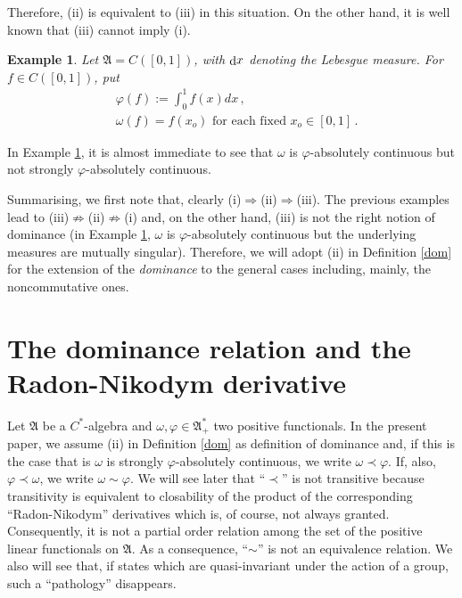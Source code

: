 \documentclass[12pt]{amsart}
\numberwithin{equation}{section}
\def\ga{{\mathfrak A}} \def\gpa{{\mathfrak a}}
\def\f{\varphi}\def\ff{\phi} \def\F{\Phi}
\def\om{\omega} \def\Om{\Omega}
\newtheorem{exa}[thm]{Example}
\def\di{\mathop{\rm d}\!}
\begin{document}
Therefore, (ii) is equivalent to (iii) in this situation. On the other hand, it is well known that (iii) cannot imply (i).
\begin{exa}
\label{exa2}
Let $\ga=C([0,1])$, with $\di x$ denoting the Lebesgue measure. For $f\in C([0,1])$, put
\begin{equation*}
\begin{split}
&\f(f):=\int_0^1 f(x)dx\,,\\
&\om(f)=f(x_o)\,\,\text{for each fixed}\,\, x_o\in[0,1]\,.
\end{split}
\end{equation*}
\end{exa}
In Example \ref{exa2}, it is almost immediate to see that $\om$ is $\f$-absolutely continuous but not strongly $\f$-absolutely continuous.

Summarising, we first note that, clearly (i)$\Rightarrow$(ii)$\Rightarrow$(iii). The previous examples lead to (iii)$\nRightarrow$(ii)$\nRightarrow$(i) and, on the other hand, (iii) is not the right notion of dominance (in Example \ref{exa2}, $\om$ is $\f$-absolutely continuous but the underlying measures are mutually singular). Therefore, we will adopt (ii) in Definition \ref{dom} for the extension of the {\it dominance} to the general cases including, mainly, the noncommutative ones.





\section{The dominance relation and the Radon-Nikodym derivative}
\label{secmain}


Let $\ga$ be a $C^*$-algebra and $\om,\f\in\ga^*_+$ two positive functionals. In the present paper, we assume (ii) in Definition \ref{dom} as definition of dominance and, if this is the case that is $\om$ is strongly $\f$-absolutely continuous, we write $\om\prec\f$. If, also, $\f\prec\om$, we write $\om\sim\f$.
We will see later that ``$\prec$'' is not transitive because transitivity is equivalent to closability of the product of the corresponding ``Radon-Nikodym'' derivatives which is, of course, not always granted. Consequently, it is not a partial order relation among the set of the positive linear functionals on $\ga$. As a consequence, ``$\sim$'' is not an equivalence relation. We also will see that, if states which are quasi-invariant under the action of a group, such a ``pathology'' disappears.
\end{document}
